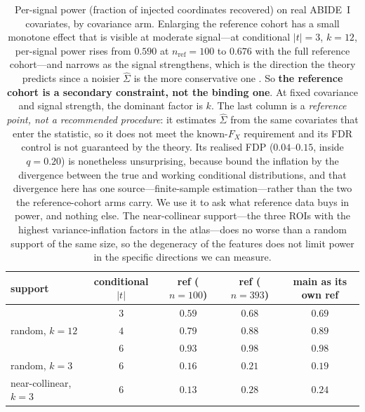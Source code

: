 \documentclass[11pt,a4paper]{article}
\begin{document}
\begin{table}[htbp]
\centering
{\small\setlength{\tabcolsep}{5pt}
\begin{tabular}{lcccc}
\toprule
support & conditional $|t|$ & ref ($n=100$) & ref ($n=393$)
 & main as its own ref \\
\midrule
\multirow{3}{*}{random, $k=12$}
 & $3$ & $0.59$ & $0.68$ & $0.69$ \\
 & $4$ & $0.79$ & $0.88$ & $0.89$ \\
 & $6$ & $0.93$ & $\mathbf{0.98}$ & $\mathbf{0.98}$ \\
\midrule
random, $k=3$            & $6$ & $0.16$ & $0.21$ & $0.19$ \\
near-collinear, $k=3$    & $6$ & $0.13$ & $0.28$ & $0.24$ \\
\bottomrule
\end{tabular}}
\caption{Per-signal power (fraction of injected coordinates recovered) on
real ABIDE~I covariates, by covariance arm. Enlarging the reference cohort
has a small monotone effect that is visible at moderate signal---at
conditional $|t|=3$, $k=12$, per-signal power rises from $0.590$ at
$n_{\mathrm{ref}}=100$ to $0.676$ with the full reference cohort---and
narrows as the signal strengthens, which is the direction the theory predicts
since a noisier $\hat\Sigma$ is the more conservative one
\citep{candes2018panning}. So \textbf{the reference cohort is a secondary
constraint, not the binding one}. At fixed covariance and signal strength,
the dominant factor is $k$. The last column is a \emph{reference point, not a
recommended procedure}: it estimates $\hat\Sigma$ from the same covariates
that enter the statistic, so it does not meet the known-$F_X$ requirement and
its FDR control is not guaranteed by the theory. Its realised FDP
($0.04$--$0.15$, inside $q=0.20$) is nonetheless unsurprising, because
\citet{barber2020robust} bound the inflation by the divergence between the
true and working conditional distributions, and that divergence here has one
source---finite-sample estimation---rather than the two the reference-cohort
arms carry. We use it to ask what reference data buys in power, and nothing
else. The
near-collinear support---the three ROIs with the highest variance-inflation
factors in the atlas---does no worse than a random support of the same size,
so the degeneracy of the features does not limit power in the specific
directions we can measure.}
\label{tab:control}
\end{table}
\end{document}
